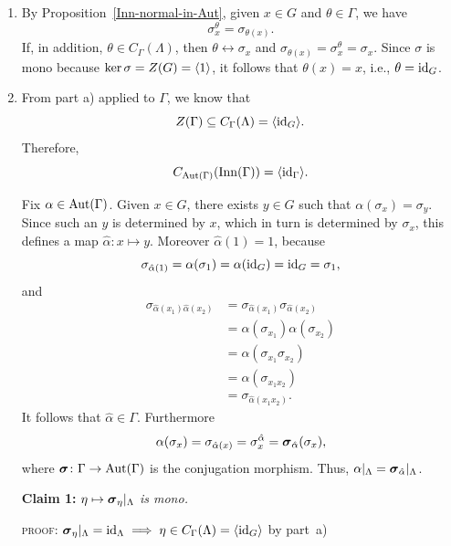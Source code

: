 \begin{solution}
\begin{enumerate}[\upshape a)]
    \item By Proposition~\ref{Inn-normal-in-Aut}, given $x\in G$ and $\theta\in\Gamma$, we have 
    $$
        \sigma_x^\theta=\sigma_{\theta(x)}.
    $$
    If, in addition, $\theta\in C_\Gamma(\Lambda)$, then $\theta\leftrightarrow\sigma_x$ and $\sigma_{\theta(x)}=\sigma_x^\theta=\sigma_x$. Since $\sigma$ is mono because $\ker\sigma=Z(G)=\langle1\rangle$, it follows that $\theta(x)=x$, i.e., $\theta=\operatorname{id}_G$.

    \item From part a) applied to $\Gamma$, we know that
    $$
        Z(\Gamma)\subseteq C_\Gamma(\Lambda) = \langle\operatorname{id}_G\rangle.
    $$
    Therefore,
    \begin{equation}\label{eq-7.1}
        C_{{\rm Aut}(\Gamma)}({\rm Inn}(\Gamma))=\langle\operatorname{id}_\Gamma\rangle.
    \end{equation}
    
    Fix $\alpha\in{\rm Aut}(\Gamma)$. Given $x\in G$, there exists $y\in G$ such that $\alpha(\sigma_x)=\sigma_y$. Since such an $y$ is determined by $x$, which in turn is determined by $\sigma_x$, this defines a map $\hat\alpha\colon x\mapsto y$. Moreover $\hat\alpha(1)=1$, because 
    $$
        \sigma_{\hat\alpha(1)}=\alpha(\sigma_1)=\alpha(\operatorname{id}_G)=\operatorname{id}_G=\sigma_1,
    $$
    and
    \begin{align*}
            \sigma_{\hat\alpha(x_1)\hat\alpha(x_2)} &= \sigma_{\hat\alpha(x_1)}\sigma_{\hat\alpha(x_2)}\\
            &= \alpha(\sigma_{x_1})\alpha(\sigma_{x_2})\\
            &= \alpha(\sigma_{x_1}\sigma_{x_2})\\
            & =\alpha(\sigma_{x_1x_2})\\
            &= \sigma_{\hat\alpha(x_1x_2)}.
    \end{align*}
    It follows that $\hat\alpha\in\Gamma$. Furthermore
    $$
        \alpha(\sigma_x)=\sigma_{\hat\alpha(x)}=\sigma_x^{\hat\alpha} = \textrm{\boldmath$\sigma$}_{\hat\alpha}(\sigma_x),
    $$
    where $\textrm{\boldmath$\sigma$}\colon\Gamma\to{\rm Aut}(\Gamma)$ is the conjugation morphism. Thus, $\alpha|_\Lambda=\textrm{\boldmath$\sigma$}_{\hat\alpha}|_\Lambda$.

   \textbf{Claim 1:} \textit{$\eta\mapsto\textrm{\boldmath$\sigma$}_\eta|_\Lambda$ is mono.}

    {\small\textsc{proof:} $\textrm{\boldmath$\sigma$}_\eta|_\Lambda=\operatorname{id}_\Lambda\implies
        \eta\in C_\Gamma(\Lambda)=\langle\operatorname{id}_G\rangle$ by part~a)}
   

\end{enumerate}
\end{solution}
